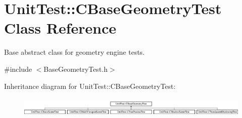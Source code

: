 \hypertarget{class_unit_test_1_1_c_base_geometry_test}{}\section{Unit\+Test\+::C\+Base\+Geometry\+Test Class Reference}
\label{class_unit_test_1_1_c_base_geometry_test}


Base abstract class for geometry engine tests.  




{\ttfamily \#include $<$Base\+Geometry\+Test.\+h$>$}

Inheritance diagram for Unit\+Test\+::C\+Base\+Geometry\+Test\+:\begin{figure}[H]
\begin{center}
\leavevmode
\includegraphics[height=0.973913cm]{class_unit_test_1_1_c_base_geometry_test}
\end{center}
\end{figure}
